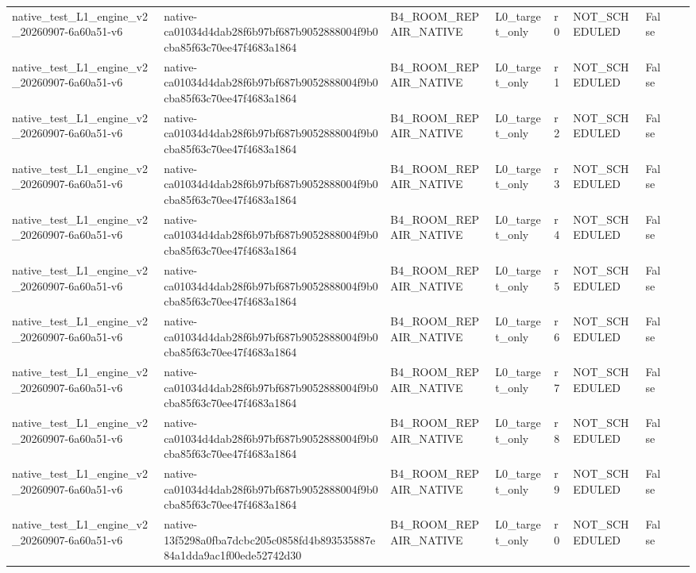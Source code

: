 \begin{tabular}{lllllllll}
native\_test\_L1\_engine\_v2\_20260907-6a60a51-v6 & native-ca01034d4dab28f6b97bf687b9052888004f9b0cba85f63c70ee47f4683a1864 & B4\_ROOM\_REPAIR\_NATIVE & L0\_target\_only & r0 & NOT\_SCHEDULED & False &  &  \\
native\_test\_L1\_engine\_v2\_20260907-6a60a51-v6 & native-ca01034d4dab28f6b97bf687b9052888004f9b0cba85f63c70ee47f4683a1864 & B4\_ROOM\_REPAIR\_NATIVE & L0\_target\_only & r1 & NOT\_SCHEDULED & False &  &  \\
native\_test\_L1\_engine\_v2\_20260907-6a60a51-v6 & native-ca01034d4dab28f6b97bf687b9052888004f9b0cba85f63c70ee47f4683a1864 & B4\_ROOM\_REPAIR\_NATIVE & L0\_target\_only & r2 & NOT\_SCHEDULED & False &  &  \\
native\_test\_L1\_engine\_v2\_20260907-6a60a51-v6 & native-ca01034d4dab28f6b97bf687b9052888004f9b0cba85f63c70ee47f4683a1864 & B4\_ROOM\_REPAIR\_NATIVE & L0\_target\_only & r3 & NOT\_SCHEDULED & False &  &  \\
native\_test\_L1\_engine\_v2\_20260907-6a60a51-v6 & native-ca01034d4dab28f6b97bf687b9052888004f9b0cba85f63c70ee47f4683a1864 & B4\_ROOM\_REPAIR\_NATIVE & L0\_target\_only & r4 & NOT\_SCHEDULED & False &  &  \\
native\_test\_L1\_engine\_v2\_20260907-6a60a51-v6 & native-ca01034d4dab28f6b97bf687b9052888004f9b0cba85f63c70ee47f4683a1864 & B4\_ROOM\_REPAIR\_NATIVE & L0\_target\_only & r5 & NOT\_SCHEDULED & False &  &  \\
native\_test\_L1\_engine\_v2\_20260907-6a60a51-v6 & native-ca01034d4dab28f6b97bf687b9052888004f9b0cba85f63c70ee47f4683a1864 & B4\_ROOM\_REPAIR\_NATIVE & L0\_target\_only & r6 & NOT\_SCHEDULED & False &  &  \\
native\_test\_L1\_engine\_v2\_20260907-6a60a51-v6 & native-ca01034d4dab28f6b97bf687b9052888004f9b0cba85f63c70ee47f4683a1864 & B4\_ROOM\_REPAIR\_NATIVE & L0\_target\_only & r7 & NOT\_SCHEDULED & False &  &  \\
native\_test\_L1\_engine\_v2\_20260907-6a60a51-v6 & native-ca01034d4dab28f6b97bf687b9052888004f9b0cba85f63c70ee47f4683a1864 & B4\_ROOM\_REPAIR\_NATIVE & L0\_target\_only & r8 & NOT\_SCHEDULED & False &  &  \\
native\_test\_L1\_engine\_v2\_20260907-6a60a51-v6 & native-ca01034d4dab28f6b97bf687b9052888004f9b0cba85f63c70ee47f4683a1864 & B4\_ROOM\_REPAIR\_NATIVE & L0\_target\_only & r9 & NOT\_SCHEDULED & False &  &  \\
native\_test\_L1\_engine\_v2\_20260907-6a60a51-v6 & native-13f5298a0fba7dcbc205c0858fd4b893535887e84a1dda9ac1f00ede52742d30 & B4\_ROOM\_REPAIR\_NATIVE & L0\_target\_only & r0 & NOT\_SCHEDULED & False &  &  \\

\end{tabular}
